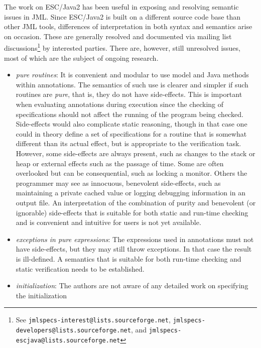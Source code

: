 \documentclass{acm_proc_article-sp}
\begin{document}
The work on ESC/Java2 has been useful in exposing and resolving
semantic issues in JML.  Since ESC/Java2 is built on a different
source code base than other JML tools, differences of interpretation
in both syntax and semantics arise on occasion.  These are generally
resolved and documented via mailing list discussions\footnote{See \texttt{jmlspecs-interest@lists.sourceforge.net}, 
\texttt{jmlspecs-developers@lists.sourceforge.net}, and
\texttt{jmlspecs-escjava@lists.sourceforge.net}}
by interested
parties.  There are, however, still unresolved issues, most of which
are the subject of ongoing research.
\setlength{\partopsep}{0in}\setlength{\parskip}{0in}\setlength{\itemsep}{0in}\setlength{\topsep}{0in}
\begin{itemize}
\setlength{\partopsep}{0in}\setlength{\parskip}{0in}\setlength{\itemsep}{0in}\setlength{\topsep}{0in}
\item \textit{pure routines}:  It is convenient and modular to use model and Java methods within
annotations.  The semantics of such use is clearer and simpler if such routines are {\em pure}, that is, they do not have side-effects.  This is important when evaluating annotations during
execution since the checking of specifications should not affect the running of the program being
checked.  Side-effects would also complicate static reasoning, though in that case one could 
in theory define a set of specifications for a routine that is somewhat different than its actual effect, but is
appropriate to the verification task.   However, some side-effects are
always present, such as changes to the stack or heap or external effects such as the passage of time.  Some are often overlooked but can be consequential, such as locking a monitor. 
 Others the programmer may
see as innocuous, benevolent side-effects, such as maintaining a private cached value or logging debugging information in an output file.
An interpretation of the combination of purity and benevolent (or ignorable)
  side-effects that is suitable for both static and run-time checking and is convenient and intuitive
for users is not yet available.
\item \textit{exceptions in pure expressions}:  The expressions used in annotations must not have
side-effects, but they may still throw exceptions.  In that case the result is ill-defined.  A
semantics that is suitable for both run-time checking and static verification needs to be 
established.
\item \textit{initialization}:  The authors are not aware of any detailed work on specifying the initialization

\end{itemize}
\end{document}
